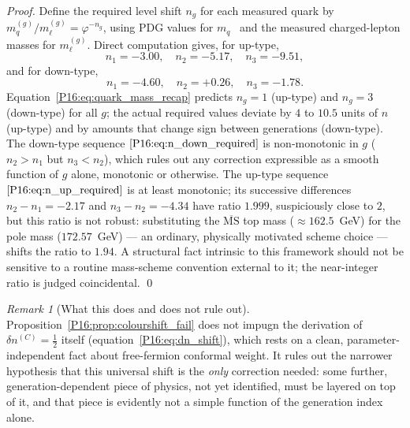 \documentclass[11pt,a4paper]{article}
\theoremstyle{definition}\newtheorem{definition}[theorem]{Definition}
\theoremstyle{remark}
\newtheorem{remark}[theorem]{Remark}
\theoremstyle{definition}\newtheorem{construction}[theorem]{Construction}
\newcommand{\vp}{\varphi}
\begin{document}
\begin{proof}
Define the required level shift $n_g$ for each measured quark by
$m_q^{(g)}/m_\ell^{(g)}=\vp^{-n_g}$, using PDG values for
$m_q$~\cite{PDG2024} and the measured charged-lepton masses for
$m_\ell^{(g)}$. Direct computation gives, for up-type,
\begin{equation}
  n_1=-3.00,\quad n_2=-5.17,\quad n_3=-9.51,
  \label{P16:eq:n_up_required}
\end{equation}
and for down-type,
\begin{equation}
  n_1=-4.60,\quad n_2=+0.26,\quad n_3=-1.78.
  \label{P16:eq:n_down_required}
\end{equation}
Equation~\eqref{P16:eq:quark_mass_recap} predicts $n_g=1$ (up-type) and
$n_g=3$ (down-type) for all $g$; the actual required values deviate by
$4$ to $10.5$ units of $n$ (up-type) and by amounts that change sign
between generations (down-type). The down-type sequence
$\eqref{P16:eq:n_down_required}$ is non-monotonic in $g$ ($n_2>n_1$ but
$n_3<n_2$), which rules out any correction expressible as a smooth
function of $g$ alone, monotonic or otherwise. The up-type sequence
$\eqref{P16:eq:n_up_required}$ is at least monotonic; its successive
differences $n_2-n_1=-2.17$ and $n_3-n_2=-4.34$ have ratio $1.999$,
suspiciously close to $2$, but this ratio is not robust: substituting
the $\overline{\mathrm{MS}}$ top mass ($\approx162.5$~GeV) for the pole
mass ($172.57$~GeV) --- an ordinary, physically motivated scheme
choice --- shifts the ratio to $1.94$. A structural fact intrinsic to
this framework should not be sensitive to a routine mass-scheme
convention external to it; the near-integer ratio is judged
coincidental.
\qed
\end{proof}

\begin{remark}[What this does and does not rule out]
\label{P16:rem:colourshift_scope}
Proposition~\ref{P16:prop:colourshift_fail} does not impugn the derivation
of $\delta n^{(C)}=\tfrac12$ itself (equation~\eqref{P16:eq:dn_shift}),
which rests on a clean, parameter-independent fact about free-fermion
conformal weight. It rules out the narrower hypothesis that this
universal shift is the \emph{only} correction needed: some further,
generation-dependent piece of physics, not yet identified, must be
layered on top of it, and that piece is evidently not a simple
function of the generation index alone.
\end{remark}
\end{document}
